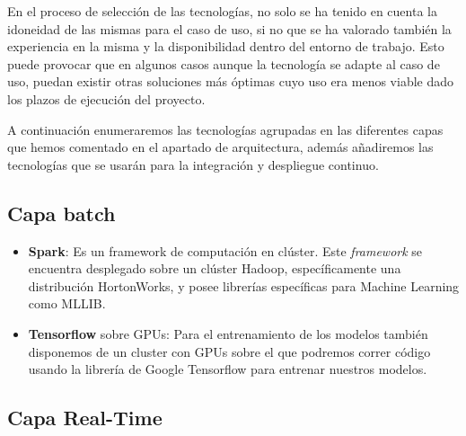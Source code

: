En el proceso de selección de las tecnologías, no solo se ha tenido en cuenta la idoneidad de las mismas para el caso de uso, si no que se ha valorado también la experiencia en la misma y la disponibilidad dentro del entorno de trabajo. Esto puede provocar que en algunos casos aunque la tecnología se adapte al caso de uso, puedan existir otras soluciones más óptimas cuyo uso era menos viable dado los plazos de ejecución del proyecto. 

A continuación enumeraremos las tecnologías agrupadas en las diferentes capas que hemos comentado en el apartado de arquitectura, además añadiremos las tecnologías que se usarán para la integración y despliegue continuo. 

\subsection{Capa batch}

\begin{itemize}
	\item \textbf{Spark}: Es un framework de computación en clúster. Este \textit{framework} se encuentra desplegado sobre un clúster Hadoop, específicamente una distribución HortonWorks, y posee librerías específicas para Machine Learning como MLLIB.
	\item \textbf{Tensorflow} sobre GPUs: Para el entrenamiento de los modelos también disponemos de un cluster con GPUs sobre el que podremos correr código usando la librería de Google Tensorflow para entrenar nuestros modelos.
\end{itemize}

\subsection{Capa Real-Time}


